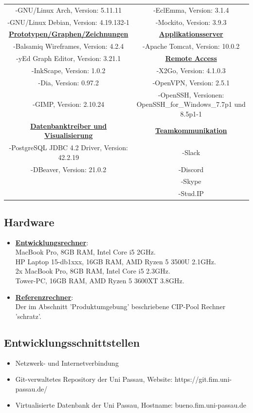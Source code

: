 \documentclass{article}
\begin{document}
\begin{center}
\begin{table}
\begin{adjustwidth}{-1.5cm}{-1cm}
\begin{tabular} { c c }
-GNU/Linux Arch, Version: 5.11.11 &-EclEmma, Version: 3.1.4\\
-GNU/Linux Debian, Version: 4.19.132-1 &-Mockito, Version: 3.9.3\\ 
\underline{\textbf{Prototypen/Graphen/Zeichnungen}} & \underline{\textbf{Applikationsserver}}\\
-Balsamiq Wireframes, Version: 4.2.4 &-Apache Tomcat, Version: 10.0.2\\
-yEd Graph Editor, Version: 3.21.1 & \underline{\textbf{Remote Access}}\\
-InkScape, Version: 1.0.2 &-X2Go, Version: 4.1.0.3\\
-Dia, Version: 0.97.2  &-OpenVPN, Version: 2.5.1\\
-GIMP, Version: 2.10.24 &-OpenSSH, Versionen: OpenSSH\_for\_Windows\_7.7p1 und 8.5p1-1\\
\underline{\textbf{Datenbanktreiber und Visualisierung}}& \underline{\textbf{Teamkommunikation}}\\
-PostgreSQL JDBC 4.2 Driver, Version: 42.2.19 &-Slack\\
-DBeaver, Version: 21.0.2 &-Discord\\
&-Skype\\
&-Stud.IP\\
\end{tabular}
\end{adjustwidth}
\end{table}
\end{center}
\subsection{Hardware}
\begin{itemize}
\item \underline{\textbf{Entwicklungsrechner}}:\\
MacBook Pro, 8GB RAM, Intel Core i5 2GHz.\\  
HP Laptop 15-db1xxx, 16GB RAM, AMD Ryzen 5 3500U 2.1GHz.\\
2x MacBook Pro, 8GB RAM, Intel Core i5 2.3GHz.\\
Tower-PC, 16GB RAM, AMD Ryzen 5 3600XT 3.8GHz.
\item \underline{\textbf{Referenzrechner}}:\\
Der im Abschnitt 'Produktumgebung' beschriebene CIP-Pool Rechner 'schratz'.
\end{itemize}
\subsection{Entwicklungsschnittstellen}
\begin{itemize}
\item Netzwerk- und Internetverbindung 
\item Git-verwaltetes Repository der Uni Passau, Website: https://git.fim.uni-passau.de/ 
\item Virtualisierte Datenbank der Uni Passau, Hostname: bueno.fim.uni-passau.de 
\end{itemize}
\end{document}
